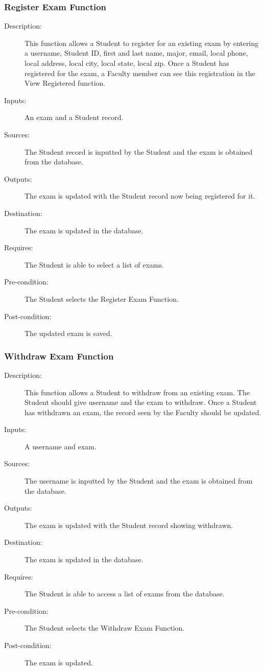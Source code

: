 \begin{boxed}
\begin{description}
\subsubsection{\large Register Exam Function} 
\begin{boxed} %
\begin{description}
\item[Description:]
   This function allows a Student to register for an existing exam by entering a
   username, Student ID, first and last name, major, email, local phone, local
   address, local city, local state, local zip.  Once a Student has registered
   for the exam, a Faculty member can see this registration in the View
   Registered function.
\item[Inputs:]
   An exam and a Student record.
\item[Sources:]
   The Student record is inputted by the Student and the exam is
   obtained from the database.
\item[Outputs:]
   The exam is updated with the Student record now being registered for
   it.
\item[Destination:]
   The exam is updated in the database.
\item[Requires:]
   The Student is able to select a list of exams.
\item[Pre-condition:]
   The Student selects the Register Exam Function.
\item[Post-condition:]
   The updated exam is saved.
\end{description}
\end{boxed} %

\subsubsection{\large Withdraw Exam Function} 
\begin{boxed} %
\begin{description}
\item[Description:]
   This function allows a Student to withdraw from an existing exam. The Student
   should give username and the exam to withdraw. Once a Student has withdrawn
   an exam, the record seen by the Faculty should be updated.
\item[Inputs:]
   A username and exam.
\item[Sources:]
   The username is inputted by the Student and the exam is obtained from
   the database.
\item[Outputs:]
   The exam is updated with the Student record showing withdrawn.
\item[Destination:]
   The exam is updated in the database.
\item[Requires:]
   The Student is able to access a list of exams from the database.
\item[Pre-condition:]
   The Student selects the Withdraw Exam Function.
\item[Post-condition:]
   The exam is updated.
\end{description}
\end{boxed} %


\end{description}
\end{boxed}
